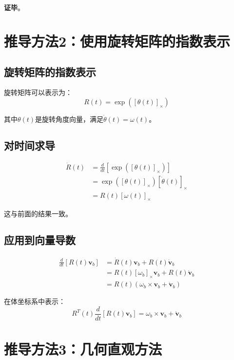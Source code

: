 \documentclass[12pt,a4paper]{article}
\begin{document}
\textbf{证毕}。

\section{推导方法2：使用旋转矩阵的指数表示}

\subsection{旋转矩阵的指数表示}

旋转矩阵可以表示为：
\begin{equation}
R(t) = \exp([\theta(t)]_{\times})
\end{equation}

其中$\theta(t)$是旋转角度向量，满足$\dot{\theta}(t) = \omega(t)$。

\subsection{对时间求导}

\begin{align}
\dot{R}(t) &= \frac{d}{dt}[\exp([\theta(t)]_{\times})] \\
&= \exp([\theta(t)]_{\times}) [\dot{\theta}(t)]_{\times} \\
&= R(t) [\omega(t)]_{\times}
\end{align}

这与前面的结果一致。

\subsection{应用到向量导数}

\begin{align}
\frac{d}{dt}[R(t) \bm{v}_b] &= \dot{R}(t) \bm{v}_b + R(t) \dot{\bm{v}}_b \\
&= R(t) [\omega_b]_{\times} \bm{v}_b + R(t) \dot{\bm{v}}_b \\
&= R(t) (\omega_b \times \bm{v}_b + \dot{\bm{v}}_b)
\end{align}

在体坐标系中表示：
\begin{equation}
R^T(t) \frac{d}{dt}[R(t) \bm{v}_b] = \omega_b \times \bm{v}_b + \dot{\bm{v}}_b
\end{equation}

\section{推导方法3：几何直观方法}
\end{document}

